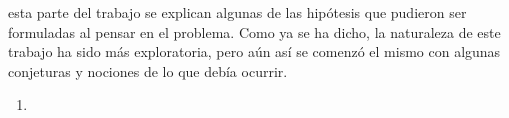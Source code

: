  esta parte del trabajo se explican algunas de las hip\'otesis
que pudieron ser formuladas al pensar en el problema. Como ya se ha dicho, la
naturaleza de este trabajo ha sido m\'as exploratoria, pero a\'un as\'i se
comenz\'o el mismo con algunas conjeturas y nociones de lo que deb\'ia ocurrir.

\begin{enumerate}
    \item{}
\end{enumerate}
